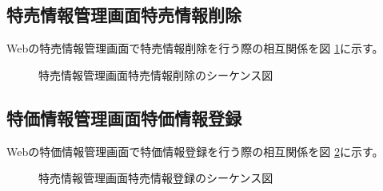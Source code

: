 \documentclass[a4j]{jarticle}
\begin{document}
\subsection{特売情報管理画面特売情報削除}
Webの特売情報管理画面で特売情報削除を行う際の相互関係を図 \ref {tab:oonishi22}に示す。
\begin{figure}[H]
\begin{center}
\caption{特売情報管理画面特売情報削除のシーケンス図}
\label{tab:oonishi22}
\end{center}
\end{figure}
\subsection{特価情報管理画面特価情報登録}
Webの特価情報管理画面で特価情報登録を行う際の相互関係を図 \ref {tab:oonishi23}に示す。
\begin{figure}[H]
\begin{center}
\caption{特売情報管理画面特売情報登録のシーケンス図}
\label{tab:oonishi23}
\end{center}
\end{figure}
\end{document}
